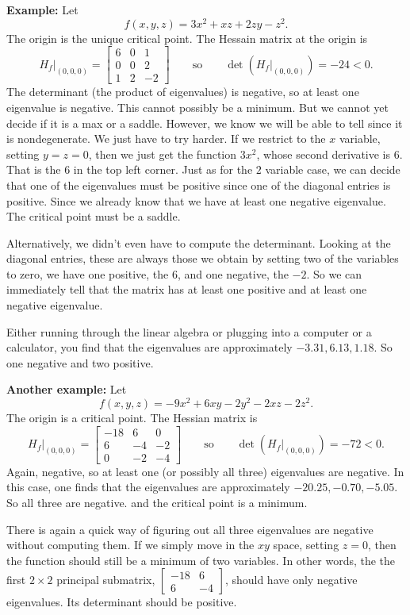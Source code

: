 \documentclass[12pt]{article}
\begin{document}
\textbf{Example:}
Let
\[
f(x,y,z) = 3x^2 + xz + 2zy - z^2 .
\]
The origin is the unique critical point.
The Hessain matrix at the origin is
\[
H_f\big|_{(0,0,0)}
=
\begin{bmatrix}
6 & 0 & 1 \\
0 & 0 & 2 \\
1 & 2 & -2
\end{bmatrix}
\qquad
\text{so}
\qquad
\det(H_f\big|_{(0,0,0)}) = -24 < 0 .
\]
The determinant (the product of eigenvalues)
is negative, so at least one eigenvalue is negative.  This cannot
possibly be a minimum.  But we cannot yet decide if it is a max or a saddle.
However, we know we will be able to tell since it is nondegenerate.  We just
have to try harder.
If we restrict to the $x$ variable, setting $y=z=0$, then we just
get the function $3x^2$, whose second derivative is $6$.  That is the $6$
in the top left corner.  Just as for the $2$ variable case, we can decide
that one of the eigenvalues must be positive since one of the diagonal
entries is positive.
Since we already know that we have at least one negative eigenvalue.
The critical point must be a saddle.

Alternatively, we didn't even have to compute the determinant.  Looking at
the diagonal entries, these are always those we obtain by setting two of
the variables to zero, we have one positive, the $6$, and one negative, the
$-2$.  So we can immediately tell that the matrix has at least one positive and 
at least one negative eigenvalue.

Either running through the linear algebra or plugging into a
computer or a calculator, you find that
the eigenvalues are
approximately $-3.31, 6.13, 1.18$.  So one negative and two positive.

\bigskip

\textbf{Another example:}
Let
\[
f(x,y,z) = -9x^2 + 6xy -2y^2 -2xz -2 z^2 .
\]
The origin is a critical point.
The Hessian matrix is
\[
H_f\big|_{(0,0,0)}
=
\begin{bmatrix}
-18 & 6 & 0 \\
6 & -4 & -2 \\
0 & -2 & -4
\end{bmatrix}
\qquad
\text{so}
\qquad
\det(H_f\big|_{(0,0,0)}) = -72 < 0 .
\]
Again, negative, so at least one (or possibly all three) eigenvalues are
negative.  In this case, one finds that the eigenvalues are
approximately $-20.25, -0.70, -5.05$.  So all three are negative.
and the critical point is a minimum.

There is again a quick way of figuring out all three eigenvalues are
negative without computing them.  If we simply move in the $xy$ space,
setting $z=0$,
then the function should still be a minimum of two variables.
In other words, the 
the first $2 \times 2$ principal submatrix,
$\left[ \begin{smallmatrix} -18 & 6 \\ 6 & -4 \end{smallmatrix} \right]$,
should have only negative eigenvalues.  Its determinant should be positive.
\end{document}

